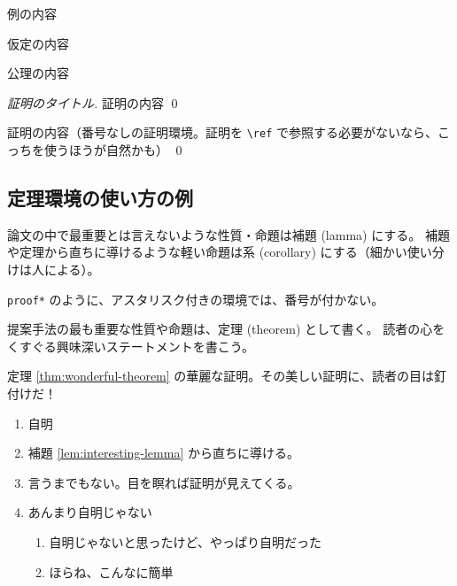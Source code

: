 \documentclass{sumiilab-paper}
\begin{document}
\begin{example}[例のタイトル]
  例の内容
\end{example}

\begin{assumption}[仮定のタイトル]
  仮定の内容
\end{assumption}

\begin{axiom}[公理のタイトル]
  公理の内容
\end{axiom}

\begin{proof}[証明のタイトル]
  証明の内容 \qed
\end{proof}

\begin{proof*}[証明のタイトル]
  証明の内容（番号なしの証明環境。証明を \lstinline|\ref| で参照する必要がないなら、こっちを使うほうが自然かも） \qed
\end{proof*}

\subsection{定理環境の使い方の例}

\begin{lemma}
  \label{lem:interesting-lemma}
  論文の中で最重要とは言えないような性質・命題は補題 (lamma) にする。
  補題や定理から直ちに導けるような軽い命題は系 (corollary) にする（細かい使い分けは人による）。
\end{lemma}

\begin{proof*}
  \lstinline|proof*| のように、アスタリスク付きの環境では、番号が付かない。
\end{proof*}

\begin{theorem}
  \label{thm:wonderful-theorem}
  提案手法の最も重要な性質や命題は、定理 (theorem) として書く。
  読者の心をくすぐる興味深いステートメントを書こう。
\end{theorem}

\begin{proof*}
  定理 \ref{thm:wonderful-theorem} の華麗な証明。その美しい証明に、読者の目は釘付けだ！
  \begin{enumerate}[leftmargin=0pt,itemindent=*,label=Case \arabic*.]
  \item 自明
  \item 補題 \ref{lem:interesting-lemma} から直ちに導ける。
  \item 言うまでもない。目を瞑れば証明が見えてくる。
  \item あんまり自明じゃない
    \begin{enumerate}[label=(\roman*)]
    \item 自明じゃないと思ったけど、やっぱり自明だった
    \item ほらね、こんなに簡単
    \end{enumerate}
  \end{enumerate}
\end{proof*}
\end{document}
